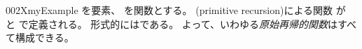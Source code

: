 \documentclass[index]{subfiles}
\begin{document}
\begin{myBlock}{002X}{myExample}
  を要素、
  を関数とする。
  (primitive recursion)による関数
  が
  と
  で定義される。
  形式的にはである。
  よって、いわゆる\emph{原始再帰的関数}はすべて構成できる。
\end{myBlock}
\end{document}
